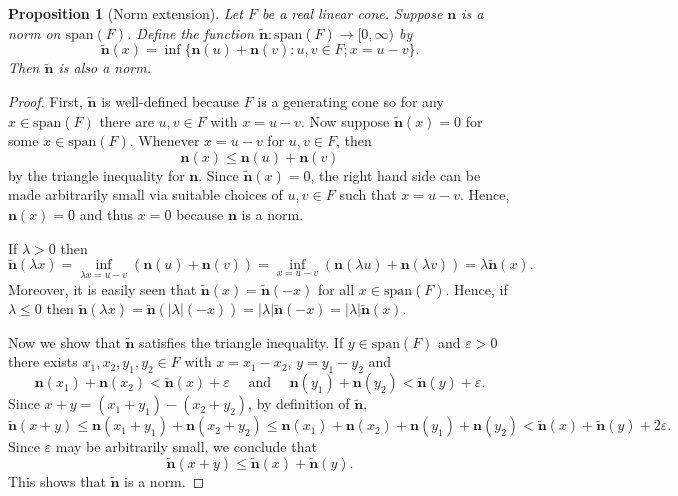 \documentclass[a4paper,11pt]{article}
\numberwithin{equation}{section}
\theoremstyle{definition}
\theoremstyle{plain}
\newtheorem{Proposition}[Definition]{Proposition}
\newcommand{\spn}{\mathrm{span}}
\let\epsilon\varepsilon
\begin{document}
\begin{Proposition}[Norm extension]
    Let $F$ be a real linear cone. Suppose $\mathbf n$ is a norm on $\spn(F)$. Define the function $\tilde{\mathbf{n}}: \spn(F) \longrightarrow [0, \infty)$ by
    \begin{equation}
    \tilde{\mathbf{n}}(x) = \inf\{\mathbf{n}(u) + \mathbf{n}(v): u, v \in F; x = u - v\}.
    \end{equation}
    Then $\tilde{\mathbf{n}}$ is also a norm.
\end{Proposition}
\begin{proof}
    First, $\tilde{\mathbf{n}}$ is well-defined because $F$ is a generating cone so for any $x \in \spn(F)$ there are $u, v \in F$ with $x = u - v$. Now suppose $\tilde{\mathbf{n}}(x) = 0$ for some $x \in \spn(F)$. Whenever $x = u - v$ for $u,v \in F$, then $$\mathbf{n}(x) \leq \mathbf{n}(u) + \mathbf{n}(v)$$ by the triangle inequality for $\mathbf{n}$. Since $\tilde{\mathbf{n}}(x) = 0$, the right hand side can be made arbitrarily small via suitable choices of $u,v \in F$ such that $x = u - v$. Hence, $\mathbf{n}(x) = 0$ and thus $x = 0$ because $\mathbf{n}$ is a norm.
    
    If $\lambda > 0$ then
    $$\tilde{\mathbf{n}}(\lambda x) = \inf_{\lambda x = u - v}(\mathbf{n}(u) + \mathbf{n}(v)) = \inf_{x = u - v}(\mathbf{n}(\lambda u) + \mathbf{n}(\lambda v)) = \lambda \tilde{\mathbf{n}}(x).$$
    Moreover, it is easily seen that $\tilde{\mathbf{n}}(x) = \tilde{\mathbf{n}}(-x)$ for all $x \in \spn(F)$. Hence, if $\lambda \leq 0$ then $\tilde{\mathbf{n}}(\lambda x) =\tilde{\mathbf{n}}(|\lambda|(-x)) = |\lambda|\tilde{\mathbf{n}}(-x) = |\lambda|\tilde{\mathbf{n}}(x)$.
    
    Now we show that $\tilde{\mathbf{n}}$ satisfies the triangle inequality. If $y \in \spn(F)$ and $\epsilon > 0$ there exists $x_{1}, x_{2}, y_{1}, y_{2} \in F$ with $x = x_{1} - x_{2}$, $y = y_{1} - y_{2}$ and
    $$\mathbf n(x_{1}) + \mathbf n(x_{2}) < \tilde{\mathbf{n}}(x) + \epsilon \quad \text{ and } \quad \mathbf n(y_{1}) + \mathbf n(y_{2}) < \tilde{\mathbf{n}}(y) + \epsilon.$$
    Since $x + y = (x_{1} + y_{1}) - (x_{2} + y_{2})$, by definition of $\tilde{\mathbf{n}}$,
    $$\tilde{\mathbf{n}}(x + y) \leq \mathbf n(x_{1} + y_{1}) + \mathbf n(x_{2} + y_{2}) \leq \mathbf n(x_{1}) + \mathbf n(x_{2}) + \mathbf n(y_{1}) + \mathbf n(y_{2}) < \tilde{\mathbf{n}}(x) + \tilde{\mathbf{n}}(y) + 2\epsilon.$$
    Since $\epsilon$ may be arbitrarily small, we conclude that
    $$\tilde{\mathbf{n}}(x + y) \leq \tilde{\mathbf{n}}(x) + \tilde{\mathbf{n}}(y).$$
    This shows that $\tilde{\mathbf{n}}$ is a norm. 
\end{proof}
\end{document}
